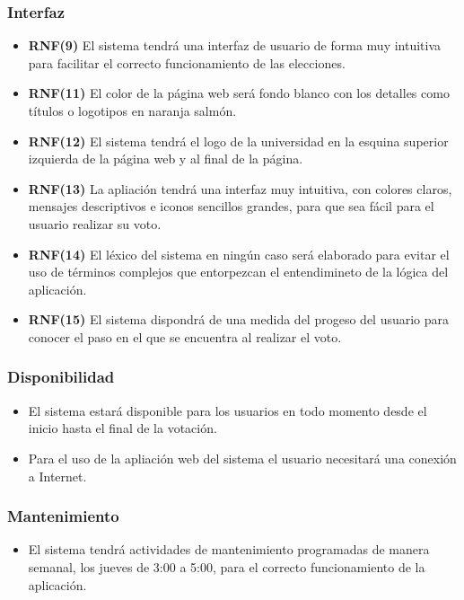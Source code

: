 \documentclass{article}
\begin{document}
        \subsubsection{Interfaz}
            \begin{itemize}
                \item  \textbf{RNF(9)} El sistema tendrá una interfaz de usuario de forma muy intuitiva para facilitar el correcto funcionamiento de las elecciones.
                \item  \textbf{RNF(11)} El color de la página web será fondo blanco con los detalles como títulos o logotipos en naranja salmón.
                \item  \textbf{RNF(12)} El sistema tendrá el logo de la universidad en la esquina superior izquierda de la página web y al final de la página.
                \item \textbf{RNF(13)} La apliación tendrá una interfaz muy intuitiva, con colores claros, mensajes descriptivos e iconos sencillos grandes, para que sea fácil para el usuario realizar su voto. 
                \item \textbf{RNF(14)} El léxico del sistema en ningún caso será elaborado para evitar el uso de términos complejos que entorpezcan el entendimineto de la lógica del aplicación.
                \item \textbf{RNF(15)} El sistema dispondrá de una medida del progeso del usuario para conocer el paso en el que se encuentra al realizar el voto.
                \end{itemize}
        \subsubsection{Disponibilidad}
        \begin{itemize}
        \item El sistema estará disponible para los usuarios en todo momento desde el inicio hasta el final de la votación.
        \item Para el uso de la apliación web del sistema el usuario necesitará una conexión a Internet.
        \end{itemize}
        
        \subsubsection{Mantenimiento}
            \begin{itemize}
                \item El sistema tendrá actividades de mantenimiento programadas de manera semanal, los jueves de 3:00 a 5:00, para el correcto funcionamiento de la aplicación.
                \end{itemize}
\end{document}
